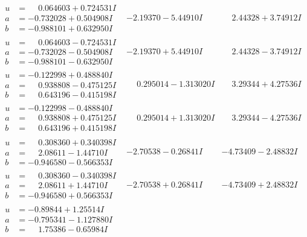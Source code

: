\documentclass[1p]{elsarticle_modified}
\theoremstyle{definition}
\begin{document}
$$\begin{array}{c|c|c}
\begin{aligned}
u &= \phantom{-}0.064603 + 0.724531 I \\
a &= -0.732028 + 0.504908 I \\
b &= -0.988101 + 0.632950 I\end{aligned}
 & -2.19370 - 5.44910 I & \phantom{-}2.44328 + 3.74912 I \\ \hline\begin{aligned}
u &= \phantom{-}0.064603 - 0.724531 I \\
a &= -0.732028 - 0.504908 I \\
b &= -0.988101 - 0.632950 I\end{aligned}
 & -2.19370 + 5.44910 I & \phantom{-}2.44328 - 3.74912 I \\ \hline\begin{aligned}
u &= -0.122998 + 0.488840 I \\
a &= \phantom{-}0.938808 - 0.475125 I \\
b &= \phantom{-}0.643196 - 0.415198 I\end{aligned}
 & \phantom{-}0.295014 - 1.313020 I & \phantom{-}3.29344 + 4.27536 I \\ \hline\begin{aligned}
u &= -0.122998 - 0.488840 I \\
a &= \phantom{-}0.938808 + 0.475125 I \\
b &= \phantom{-}0.643196 + 0.415198 I\end{aligned}
 & \phantom{-}0.295014 + 1.313020 I & \phantom{-}3.29344 - 4.27536 I \\ \hline\begin{aligned}
u &= \phantom{-}0.308360 + 0.340398 I \\
a &= \phantom{-}2.08611 - 1.44710 I \\
b &= -0.946580 - 0.566353 I\end{aligned}
 & -2.70538 - 0.26841 I & -4.73409 - 2.48832 I \\ \hline\begin{aligned}
u &= \phantom{-}0.308360 - 0.340398 I \\
a &= \phantom{-}2.08611 + 1.44710 I \\
b &= -0.946580 + 0.566353 I\end{aligned}
 & -2.70538 + 0.26841 I & -4.73409 + 2.48832 I \\ \hline\begin{aligned}
u &= -0.89844 + 1.25514 I \\
a &= -0.795341 - 1.127880 I \\
b &= \phantom{-}1.75386 - 0.65984 I\end{aligned}

\end{array}$$
\end{document}
